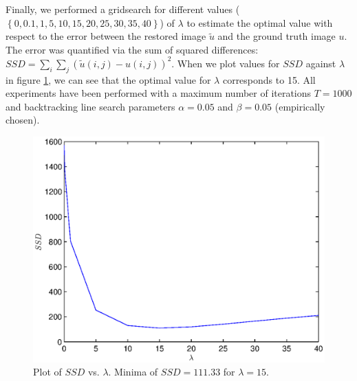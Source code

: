 \documentclass{paper}
\begin{document}
Finally, we performed a gridsearch for different values (\begin{math}\left\{0,0.1,1,5,10,15,20,25,30,35,40\right\}\end{math}) of \begin{math}\lambda\end{math} to estimate the optimal value with respect to the error between the restored image \begin{math}\tilde{u}\end{math} and the ground truth image \begin{math}u\end{math}. The error was quantified via the sum of squared differences: \begin{math}SSD=\sum_{i}\sum_{j}\left(\tilde{u}(i,j)-u(i,j)\right)^{2}\end{math}. When we plot values for \begin{math}SSD\end{math} against \begin{math}\lambda\end{math} in figure \ref{fig:plot}, we can see that the optimal value for \begin{math}\lambda\end{math} corresponds to 15. All experiments have been performed with a maximum number of iterations \begin{math}T=1000\end{math} and backtracking line search parameters \begin{math}\alpha=0.05\end{math} and \begin{math}\beta=0.05\end{math} (empirically chosen).

    \begin{figure}[!h]
      \centering
         \includegraphics[scale=0.4]{lambdaplot.eps}                 
      \caption{Plot of $SSD$ vs. $\lambda$. Minima of $SSD=111.33$ for $\lambda=15$.}
      \label{fig:plot}
    \end{figure}
    
\end{document}

